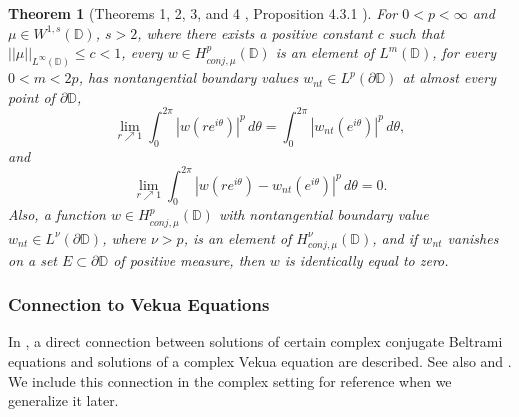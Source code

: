 \documentclass[12pt,reqno]{amsart}
\newtheorem{theorem}{Theorem}[section]
\theoremstyle{definition}
\theoremstyle{remark}
\newcommand{\p}{\partial}
\newcommand{\disk}{\mathbb{D}}
\begin{document}
         \begin{theorem}[Theorems 1, 2, 3, and 4 \cite{Klim2016}, Proposition 4.3.1 \cite{conjbel}]\label{thm: conjbelinclusioninlebesgue}\label{conjbvcon}\label{thm: conjzeroposmesidentzero}
             For $0 < p < \infty$ and $\mu \in W^{1,s}(\disk)$, $s>2$, where there exists a positive constant $c$ such that $||\mu||_{L^\infty(\disk)} \leq c < 1$, every $w \in H^{p}_{conj,\mu}(\disk)$ is an element of $L^m(\disk)$, for every $0 < m < 2p$, has nontangential boundary values $w_{nt} \in L^p(\partial \disk)$ at almost every point of $\p \disk$, 
        \[
            \lim_{r\nearrow 1} \int_0^{2\pi} |w(re^{i\theta})|^p \, d\theta = \int_0^{2\pi} |w_{nt}(e^{i\theta})|^p \,d\theta,
        \]
        and
        \[
            \lim_{r\nearrow 1} \int_0^{2\pi} |w(re^{i\theta})- w_{nt}(e^{i\theta})|^p \, d\theta = 0.
        \]
Also, a function $w \in H^p_{conj,\mu}(\disk)$ with nontangential boundary value $w_{nt} \in L^\nu(\p \disk)$, where $\nu > p$, is an element of $H^\nu_{conj,\mu}(\disk)$, and if $w_{nt}$ vanishes on a set $E \subset \p \disk$ of positive measure, then $w$ is identically equal to zero.
        \end{theorem}




        \subsubsection{Connection to Vekua Equations}\label{subsubsection: conjbelvekconnect}
        
        
        In \cite{conjbel}, a direct connection between solutions of certain complex conjugate Beltrami equations and solutions of a complex Vekua equation are described. See also \cite{BersNir} and \cite{Vek}. We include this connection in the complex setting for reference when we generalize it later.
        
\end{document}
